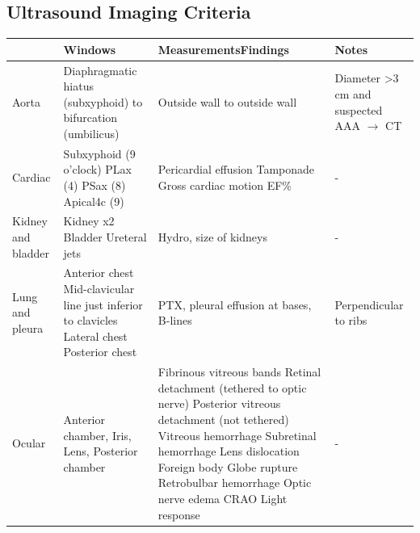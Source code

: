\documentclass[8pt]{extarticle}
\begin{document}
\subsection{Ultrasound Imaging Criteria}
\begin{tabularx}{\linewidth}{|X|X|X|X|}
\hline
\textbf{} & \textbf{Windows} & \textbf{Measurements\break Findings}  & \textbf{Notes} \\
\hline
Aorta & Diaphragmatic hiatus (subxyphoid) to bifurcation (umbilicus) & Outside wall to outside wall & Diameter >3 cm and suspected AAA $\rightarrow$ CT  \\
\hline
Cardiac & 
Subxyphoid (9 o'clock)\break 
PLax (4)\break
PSax (8)\break
Apical4c (9)
& 
Pericardial effusion\break
Tamponade\break
Gross cardiac motion\break
EF\%
& - \\
\hline
Kidney and bladder &
Kidney x2\break
Bladder\break
Ureteral jets
& Hydro, size of kidneys & - \\
\hline
Lung and pleura &
Anterior chest\break
Mid-clavicular line just inferior to clavicles\break
Lateral chest\break
Posterior chest\break &
PTX, pleural effusion at bases, B-lines & Perpendicular to ribs \\
\hline
Ocular &
Anterior chamber, Iris, Lens, Posterior chamber &
Fibrinous vitreous bands\break
Retinal detachment (tethered to optic nerve)\break
Posterior vitreous detachment (not tethered)\break
Vitreous hemorrhage\break
Subretinal hemorrhage\break
Lens dislocation\break
Foreign body\break
Globe rupture\break
Retrobulbar hemorrhage\break
Optic nerve edema\break
CRAO\break
Light response\break &
- \\
\hline
\end{tabularx}
\end{document}
